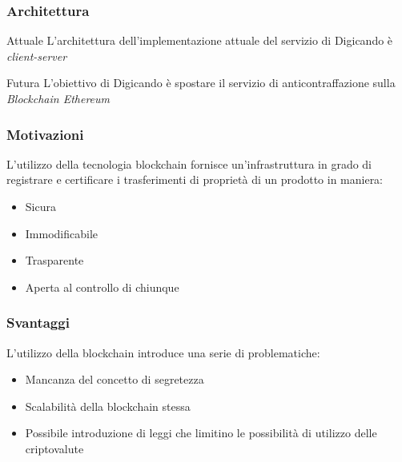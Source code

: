 \documentclass{beamer}
\begin{document}

\begin{frame}
\frametitle{Architettura}

\begin{block}{Attuale}
L'architettura dell'implementazione attuale del servizio di Digicando è \emph{client-server}
\end{block}

\begin{block}{Futura}
L’obiettivo di Digicando è spostare il servizio di anticontraffazione sulla \emph{Blockchain Ethereum}
\end{block}

\end{frame}


\begin{frame}
\frametitle{Motivazioni}
L'utilizzo della tecnologia blockchain fornisce un'infrastruttura in grado di registrare e certificare i trasferimenti di proprietà di un prodotto in maniera:

\begin{itemize}
    \item Sicura
    \item Immodificabile
    \item Trasparente
    \item Aperta al controllo di chiunque
\end{itemize}

\end{frame}


\begin{frame}
\frametitle{Svantaggi}
L'utilizzo della blockchain introduce una serie di problematiche:

\begin{itemize}
    \item Mancanza del concetto di segretezza
    \item Scalabilità della blockchain stessa
    \item Possibile introduzione di leggi che limitino le possibilità di utilizzo delle criptovalute
\end{itemize}

\end{frame}

\end{document}
